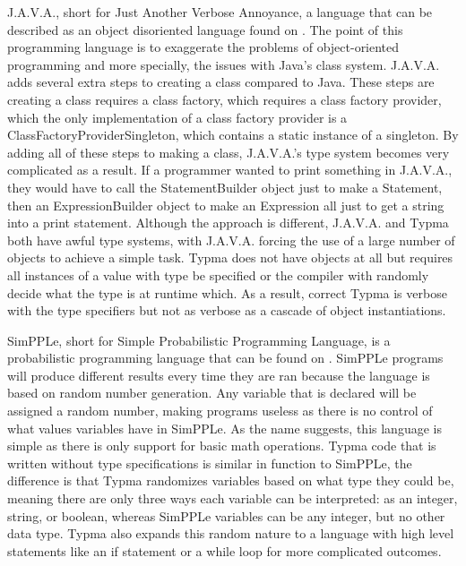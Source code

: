 \documentclass[10pt,twocolumn]{article}
\begin{document}
J.A.V.A., short for Just Another Verbose Annoyance, a language that can be described as an object disoriented language found on \textcite{J.A.V.A.}. The point of this programming language is to exaggerate the problems of object-oriented programming and more specially, the issues with Java's class system. J.A.V.A. adds several extra steps to creating a class compared to Java. These steps are creating a class requires a class factory, which requires a class factory provider, which the only implementation of a class factory provider is a ClassFactoryProviderSingleton, which contains a static instance of a singleton. By adding all of these steps to making a class, J.A.V.A.'s type system becomes very complicated as a result. If a programmer wanted to print something in J.A.V.A., they would have to call the StatementBuilder object just to make a Statement, then an ExpressionBuilder object to make an Expression all just to get a string into a print statement. Although the approach is different, J.A.V.A. and Typma both have awful type systems, with J.A.V.A. forcing the use of a large number of objects to achieve a simple task. Typma does not have objects at all but requires all instances of a value with type be specified or
the compiler with randomly decide what the type is at runtime which. As a result, correct Typma is verbose with the type specifiers but not as verbose as a cascade of object instantiations. 

SimPPLe, short for Simple Probabilistic Programming Language, is a probabilistic programming language that can be found on \textcite{SimPPLe}. SimPPLe programs will produce different results every time they are ran because the language is based on random number generation. Any variable that is declared will be assigned a random number, making programs useless as there is no control of what values variables have in SimPPLe. As the name suggests, this language is simple as there is only support for basic math operations. Typma code that is written without type specifications is similar in function to SimPPLe, the difference is that Typma randomizes variables based on what type they could be, meaning there are only three ways each variable can be interpreted: as an integer, string, or boolean, whereas SimPPLe variables can be any integer, but no other data type. Typma also expands this random nature to a language with high level statements like an if statement or a while loop for more complicated outcomes.
\end{document}
